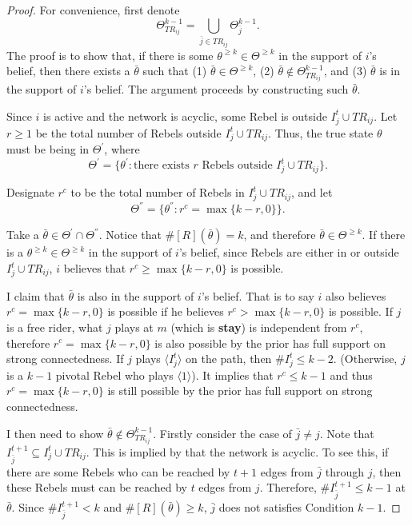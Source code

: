 \documentclass[12pt,letter]{article}
\theoremstyle{definition}
\theoremstyle{definition}
\theoremstyle{remark}
\theoremstyle{claim}
\begin{document}
\begin{proof}
For convenience, first denote
\[\Theta^{k-1}_{TR_{ij}}=\bigcup_{\bar{j}\in TR_{ij}}\Theta^{k-1}_{\bar{j}}.\]
The proof is to show that, if there is some $\theta^{\geq k}\in\Theta^{\geq k}$ in the support of $i$'s belief, then there exists a $\bar{\theta}$ such that (1) $\bar{\theta}\in\Theta^{\geq k}$, (2) $\bar{\theta}\not\in \Theta^{k-1}_{TR_{ij}}$, and (3) $\bar{\theta}$ is in the support of $i$'s belief. The argument proceeds by constructing such $\bar{\theta}$. 

Since $i$ is active and the network is acyclic, some Rebel is outside $I^t_j\cup TR_{ij}$. Let $r\geq 1$ be the total number of Rebels outside $I^t_j\cup TR_{ij}$. Thus, the true state $\theta$ must be being in ${\Theta}^{'}$, where
\[{\Theta}^{'}=\{{\theta}^{'}:\text{there exists $r$ Rebels outside $I^t_j\cup TR_{ij}$}\}.\]

Designate $r^c$ to be the total number of Rebels in $I^t_j\cup TR_{ij}$, and let
\[{\Theta}^{''}=\{{\theta}^{''}:\text{$r^c=\max\{k-r,0\}$}\}.\]

Take a ${\bar{\theta}}\in\Theta^{'}\cap \Theta^{''}$. Notice that $\#[R]({\bar{\theta}})= k$, and therefore ${\bar{\theta}}\in \Theta^{\geq k}$. If there is a $\theta^{\geq k}\in\Theta^{\geq k}$ in the support of $i$'s belief, since Rebels are either in or outside $I^t_j\cup TR_{ij}$, $i$ believes that $r^c\geq \max\{k-r, 0\}$ is possible. 

I claim that ${\bar{\theta}}$ is also in the support of $i$'s belief. That is to say $i$ also believes $r^c=\max\{k-r,0\}$ is possible if he believes $r^c>\max\{k-r,0\}$ is possible. If $j$ is a free rider, what $j$ plays at $m$ (which is \textbf{stay}) is independent from $r^c$, therefore $r^c=\max\{k-r,0\}$ is also possible by the prior has full support on strong connectedness. If $j$ plays $\langle I^t_j \rangle$ on the path, then $\#I^t_j\leq k-2$. (Otherwise, $j$ is a $k-1$ pivotal Rebel who plays $\langle 1 \rangle$). It implies that $r^c\leq k-1$ and thus $r^c=\max\{k-r,0\}$ is still possible by the prior has full support on strong connectedness.

I then need to show $\bar{\theta}\not\in \Theta^{k-1}_{TR_{ij}}$. Firstly consider the case of $\bar{j}\neq j$. Note that $I^{t+1}_{\bar{j}}\subseteq I^t_j\cup TR_{ij}$. This is implied by that the network is acyclic. To see this, if there are some Rebels who can be reached by $t+1$ edges from $\bar{j}$ through $j$, then these Rebels must can be reached by $t$ edges from $j$. Therefore, $\#I^{t+1}_{\bar{j}}\leq k-1$ at $\bar{\theta}$. Since $\#I^{t+1}_{\bar{j}}<k$ and $\#[R](\bar{\theta})\geq k$, $\bar{j}$ does not satisfies Condition $k-1$.


\end{proof}
\end{document}
